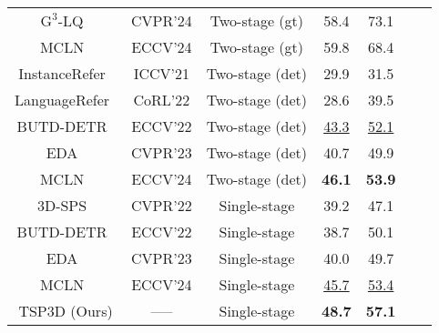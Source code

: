 \begin{table}[t]
{\begin{tabular}{ccccccc}
\rowcolor{gray!20} \(\text{G}^3\)-LQ~\citep{wang2024g}  & CVPR'24 & Two-stage (gt) & 58.4 & 73.1 \\
\rowcolor{gray!20} MCLN~\citep{qian2025multi} & ECCV'24 & Two-stage (gt) & 59.8 & 68.4 \\
\midrule
InstanceRefer~\citep{yuan2021instancerefer}  & ICCV'21 & Two-stage (det) & 29.9 & 31.5 \\
LanguageRefer~\citep{roh2022languagerefer}  & CoRL'22 & Two-stage (det) &  28.6 & 39.5 \\
BUTD-DETR~\citep{jain2022bottom} & ECCV'22 & Two-stage (det) & \underline{43.3} & \underline{52.1} \\
EDA~\citep{wu2023eda}   & CVPR'23 & Two-stage (det) & 40.7 & 49.9  \\
MCLN~\citep{qian2025multi} & ECCV'24 & Two-stage (det) & \textbf{46.1} & \textbf{53.9} \\
\midrule
3D-SPS~\citep{luo20223d}  & CVPR'22 & Single-stage & 39.2 & 47.1 \\
BUTD-DETR~\citep{jain2022bottom} & ECCV'22 & Single-stage & 38.7 & 50.1 \\
EDA~\citep{wu2023eda}   & CVPR'23 & Single-stage & 40.0 & 49.7  \\
MCLN~\citep{qian2025multi} & ECCV'24 & Single-stage & \underline{45.7} & \underline{53.4} \\
TSP3D (Ours)    & ----- & Single-stage & \textbf{48.7} & \textbf{57.1} \\
\bottomrule
\end{tabular}
}
\vspace{-.3cm}
\end{table}


